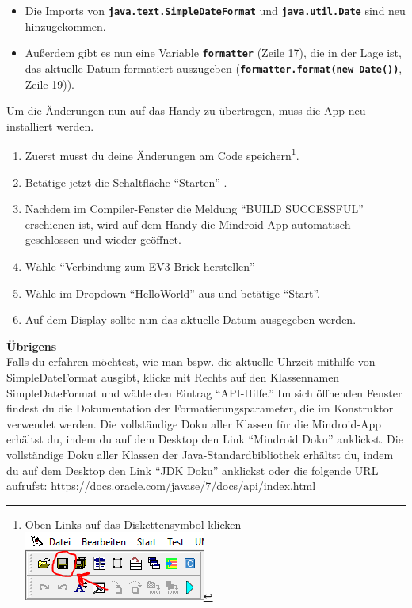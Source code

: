 \documentclass[
	12pt,
	colorbacktitle,
	accentcolor=tud1c,
	draft,
	twoside,
	german
]{tudexercise}
\newcommand{\solpath}[0]{../../impl/androidApp/app/src/main/java/org/mindroid/android/app/programs/workshop/solutions}
\newcommand{\bfcode}[1]{\texttt{\textbf{#1}}}
\begin{document}
		
		
		\begin{itemize}
		\item Die Imports von \bfcode{java.text.SimpleDateFormat} und \bfcode{java.util.Date} sind neu hinzugekommen.
		\item Außerdem gibt es nun eine Variable \bfcode{formatter} (Zeile 17), die in der Lage ist, das aktuelle Datum formatiert auszugeben (\bfcode{formatter.format(new Date())}, Zeile 19)).
		\end{itemize}
		Um die Änderungen nun auf das Handy zu übertragen, muss die App neu installiert werden.
		\begin{enumerate}
		\item Zuerst musst du deine Änderungen am Code 
		 speichern\footnote{Oben Links auf das Diskettensymbol klicken \includegraphics[]{img/je_savebutton}}. 
		\item Betätige jetzt die Schaltfläche “Starten” .
		\item Nachdem im Compiler-Fenster die Meldung “BUILD SUCCESSFUL” erschienen ist, wird auf dem Handy die Mindroid-App automatisch geschlossen und wieder geöffnet.
		\item Wähle “Verbindung zum EV3-Brick herstellen”
		\item Wähle im Dropdown “HelloWorld” aus und betätige “Start”.
		\item Auf dem Display sollte nun das aktuelle Datum ausgegeben werden.
		
		\end{enumerate}
		
	\textbf{Übrigens}\\
		
	Falls du erfahren möchtest, wie man bspw. die aktuelle Uhrzeit mithilfe von SimpleDateFormat ausgibt, klicke mit Rechts auf den Klassennamen SimpleDateFormat und wähle den Eintrag “API-Hilfe.” Im sich öffnenden Fenster findest du die Dokumentation der Formatierungsparameter, die im Konstruktor verwendet werden.
	Die vollständige Doku aller Klassen für die Mindroid-App erhältst du, indem du auf dem Desktop den Link “Mindroid Doku” anklickst.
	Die vollständige Doku aller Klassen der Java-Standardbibliothek erhältst du, indem du auf dem Desktop den Link “JDK Doku” anklickst oder die folgende URL aufrufst: https://docs.oracle.com/javase/7/docs/api/index.html 
	
\end{document}
